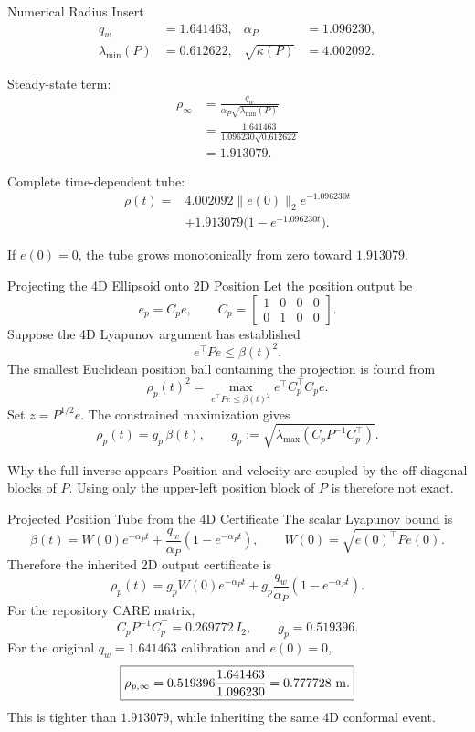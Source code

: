 \documentclass[aspectratio=43,11pt]{beamer}
\newcommand{\lmin}{\lambda_{\min}}
\begin{document}
\begin{frame}{Numerical Radius}
\small
Insert
\begin{align*}
q_w&=1.641463, & \alpha_P&=1.096230,\\
\lmin(P)&=0.612622, & \sqrt{\kappa(P)}&=4.002092.
\end{align*}

Steady-state term:
\begin{align*}
\rho_\infty
&=\frac{q_w}{\alpha_P\sqrt{\lmin(P)}}\\
&=\frac{1.641463}{1.096230\sqrt{0.612622}}\\
&=\boxed{1.913079}.
\end{align*}

Complete time-dependent tube:
\[
\boxed{\begin{aligned}
\rho(t)={}&4.002092\|e(0)\|_2e^{-1.096230t}\\
&+1.913079\big(1-e^{-1.096230t}\big).
\end{aligned}}
\]

If $e(0)=0$, the tube grows monotonically from zero toward $1.913079$.
\end{frame}

\begin{frame}{Projecting the 4D Ellipsoid onto 2D Position}
\small
Let the position output be
\[
e_p=C_p e,
\qquad
C_p=\begin{bmatrix}1&0&0&0\\0&1&0&0\end{bmatrix}.
\]
Suppose the 4D Lyapunov argument has established
\[
e^\top P e\leq \beta(t)^2.
\]
The smallest Euclidean position ball containing the projection is found from
\[
\rho_p(t)^2=
\max_{e^\top Pe\leq\beta(t)^2}e^\top C_p^\top C_p e.
\]
Set $z=P^{1/2}e$.  The constrained maximization gives
\[
\boxed{
\rho_p(t)=g_p\,\beta(t),\qquad
g_p:=\sqrt{\lambda_{\max}\!\left(C_pP^{-1}C_p^\top\right)}.}
\]

\begin{alertblock}{Why the full inverse appears}
Position and velocity are coupled by the off-diagonal blocks of $P$.
Using only the upper-left position block of $P$ is therefore not exact.
\end{alertblock}
\end{frame}

\begin{frame}{Projected Position Tube from the 4D Certificate}
The scalar Lyapunov bound is
\[
\beta(t)=W(0)e^{-\alpha_Pt}
+\frac{q_w}{\alpha_P}(1-e^{-\alpha_Pt}),
\qquad W(0)=\sqrt{e(0)^\top Pe(0)}.
\]
Therefore the inherited 2D output certificate is
\[
\boxed{
\rho_p(t)=g_pW(0)e^{-\alpha_Pt}
+g_p\frac{q_w}{\alpha_P}(1-e^{-\alpha_Pt}).}
\]
For the repository CARE matrix,
\[
C_pP^{-1}C_p^\top=0.269772\,I_2,
\qquad g_p=0.519396.
\]
For the original $q_w=1.641463$ calibration and $e(0)=0$,
\[
\boxed{\rho_{p,\infty}=0.519396\frac{1.641463}{1.096230}
=0.777728\ {\rm m}.}
\]
This is tighter than $1.913079$, while inheriting the same 4D conformal event.
\end{frame}
\end{document}
